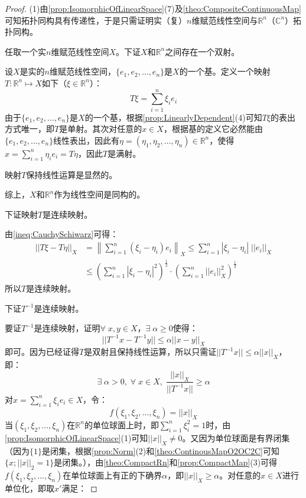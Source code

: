 \begin{proof}
	(1)由\cref{prop:IsomorphicOfLinearSpace}(7)及\cref{theo:CompositeContinuousMap}可知拓扑同构具有传递性，于是只需证明实（复）$n$维赋范线性空间与$\mathbb{R}^{n}$（$\mathbb{C}^{n}$）拓扑同构。\par
	任取一个实$n$维赋范线性空间$X$。下证$X$和$\mathbb{R}^{n}$之间存在一个双射。\par
	设$X$是实的$n$维赋范线性空间，$\{e_1,e_2,\dots,e_n\}$是$X$的一个基。定义一个映射$T:\mathbb{R}^{n}\mapsto X$如下（$\xi\in\mathbb{R}^{n}$）：
	\begin{equation*}
		T\xi=\sum_{i=1}^n\xi_ie_i
	\end{equation*}
	由于$\{e_1,e_2,\dots,e_n\}$是$X$的一个基，根据\cref{prop:LinearlyDependent}(4)可知$T\xi$的表出方式唯一，即$T$是单射。其次对任意的$x\in X$，根据基的定义它必然能由$\{e_1,e_2,\dots,e_n\}$线性表出，因此有$\eta=(\eta_1,\eta_2,\dots,\eta_n)\in\mathbb{R}^{n}$，使得$x=\sum\limits_{i=1}^n\eta_ie_i=T\eta$，因此$T$是满射。\par
	映射$T$保持线性运算是显然的。\par
	综上，$X$和$\mathbb{R}^{n}$作为线性空间是同构的。\par
	下证映射$T$是连续映射。\par
	由\cref{ineq:CauchySchiwarz}可得：
	\begin{align*}
		||T\xi-T\eta||_X
		&=\left\|\sum_{i=1}^n(\xi_i-\eta_i)e_i\right\|_X\leqslant\sum_{i=1}^n|\xi_i-\eta_i|\;||e_i||_X \\
		&\leqslant\left(\sum_{i=1}^n|\xi_i-\eta_i|^2\right)^\frac{1}{2}\cdot\left(\sum_{i=1}^n||e_i||_X^2\right)^\frac{1}{2}
	\end{align*}
	所以$T$是连续映射。\par
	下证$T^{-1}$是连续映射。\par
	要证$T^{-1}$是连续映射，证明$\forall\;x,y\in X$，$\exists\;\alpha\geqslant0$使得：
	\begin{equation*}
		||T^{-1}x-T^{-1}y||\leqslant\alpha||x-y||_X
	\end{equation*}
	即可。因为已经证得$T$是双射且保持线性运算，所以只需证$||T^{-1}x||\leqslant\alpha||x||_X$，即：
	\begin{equation*}
		\exists\;\alpha>0,\;\forall\;x\in X,\;\frac{||x||_X}{||T^{-1}x||}\geqslant\alpha
	\end{equation*}
	对$x=\sum\limits_{i=1}^n\xi_ie_i\in X$，令：
	\begin{equation*}
		f(\xi_1,\xi_2,\dots,\xi_n)=||x||_X
	\end{equation*}
	当$(\xi_1,\xi_2,\dots,\xi_n)$在$\mathbb{R}^{n}$的单位球面上时，即$\sum\limits_{i=1}^n\xi_i^2=1$时，由\cref{prop:IsomorphicOfLinearSpace}(1)可知$||x||_X\ne0$。又因为单位球面是有界闭集（因为$\{1\}$是闭集，根据\cref{prop:Norm}(2)和\cref{theo:ContinousMapO2OC2C}可知$\{x;||x||_2=1\}$是闭集。），由\cref{theo:CompactRn}和\cref{prop:CompactMap}(3)可得$f(\xi_1,\xi_2,\dots,\xi_n)$在单位球面上有正的下确界$\alpha$，即$||x||_X\geqslant\alpha$。对任意的$x\in X$进行单位化，即取$x'$满足：

\end{proof}
